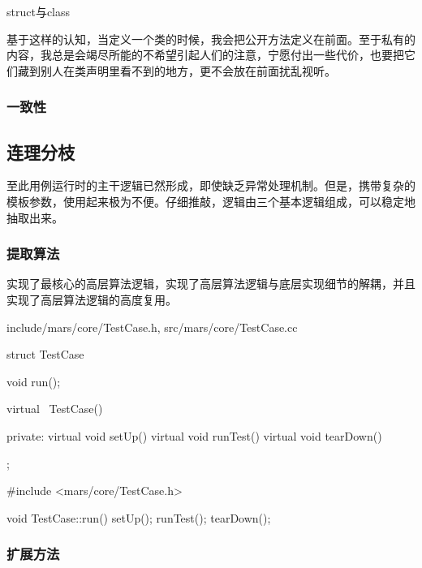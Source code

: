 \begin{content}
\begin{episode}{struct与class}
\begin{content}
基于这样的认知，当定义一个类的时候，我会把公开方法定义在前面。至于私有的内容，我总是会竭尽所能的不希望引起人们的注意，宁愿付出一些代价，也要把它们藏到别人在类声明里看不到的地方，更不会放在前面扰乱视听。

\subsubsection{一致性}

\end{content}
\end{episode}

\subsection{连理分枝}

至此用例运行时的主干逻辑已然形成，即使缺乏异常处理机制。但是，携带复杂的模板参数，使用起来极为不便。仔细推敲，逻辑由三个基本逻辑组成，可以稳定地抽取出来。

\begin{enum}
\end{enum}

\subsubsection{提取算法}

实现了最核心的高层算法逻辑，实现了高层算法逻辑与底层实现细节的解耦，并且实现了高层算法逻辑的高度复用。

\begin{diff}{include/mars/core/TestCase.h, src/mars/core/TestCase.cc}
 \begin{minicpp}
struct TestCase {
  void run();

  virtual ~TestCase() {}

private:
  virtual void setUp() {}
  virtual void runTest() {}
  virtual void tearDown() {}
};
  \end{minicpp}
\tcblower
 \begin{minicpp}
#include <mars/core/TestCase.h>

void TestCase::run() {
  setUp();
  runTest();
  tearDown();
}
  \end{minicpp}
\end{diff}

\subsubsection{扩展方法}


\end{content}
